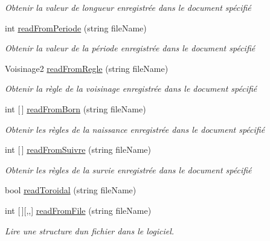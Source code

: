 \begin{DoxyCompactItemize}
\begin{DoxyCompactList}\small\item\em Obtenir la valeur de longueur enregistrée dans le document spécifié \end{DoxyCompactList}\item 
int \mbox{\hyperlink{class_local_storage_a8e862054e8b3f3c33dd64ed44d5983c4}{read\+From\+Periode}} (string file\+Name)
\begin{DoxyCompactList}\small\item\em Obtenir la valeur de la période enregistrée dans le document spécifié \end{DoxyCompactList}\item 
Voisinage2 \mbox{\hyperlink{class_local_storage_afbd7328c28fa47b11fcc174da3cc8ec1}{read\+From\+Regle}} (string file\+Name)
\begin{DoxyCompactList}\small\item\em Obtenir la règle de la voisinage enregistrée dans le document spécifié \end{DoxyCompactList}\item 
int \mbox{[}$\,$\mbox{]} \mbox{\hyperlink{class_local_storage_aa66a98dccf6cb550c5a38c25b9712898}{read\+From\+Born}} (string file\+Name)
\begin{DoxyCompactList}\small\item\em Obtenir les règles de la naissance enregistrée dans le document spécifié \end{DoxyCompactList}\item 
int \mbox{[}$\,$\mbox{]} \mbox{\hyperlink{class_local_storage_a0c0003569be45cff5fda794e42243c1e}{read\+From\+Suivre}} (string file\+Name)
\begin{DoxyCompactList}\small\item\em Obtenir les règles de la survie enregistrée dans le document spécifié \end{DoxyCompactList}\item 
bool \mbox{\hyperlink{class_local_storage_a9197311a356432fa7a9480c69f42dd9c}{read\+Toroidal}} (string file\+Name)
\item 
int \mbox{[}$\,$\mbox{]}\mbox{[},,\mbox{]} \mbox{\hyperlink{class_local_storage_a200c8f22ceed88238703411e2c0f1e05}{read\+From\+File}} (string file\+Name)
\begin{DoxyCompactList}\small\item\em Lire une structure d\textquotesingle{}un fichier dans le logiciel. \end{DoxyCompactList}\end{DoxyCompactItemize}
